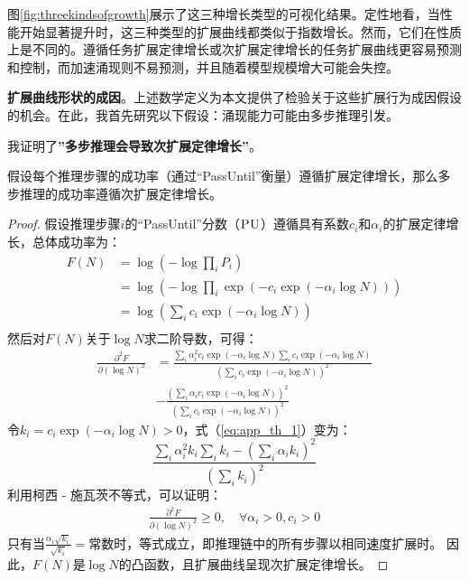 图\ref{fig:threekindsofgrowth}展示了这三种增长类型的可视化结果。定性地看，当性能开始显著提升时，这三种类型的扩展曲线都类似于指数增长。然而，它们在性质上是不同的。遵循任务扩展定律增长或次扩展定律增长的任务扩展曲线更容易预测和控制，而加速涌现则不易预测，并且随着模型规模增大可能会失控。

{\textbf{扩展曲线形状的成因}。上述数学定义为本文提供了检验关于这些扩展行为成因假设的机会。在此，我首先研究以下假设：涌现能力可能由多步推理引发\citep{srivastava2022beyond, wei2022emergent, schaeffer2023emergent}。}

我证明了\textbf{”多步推理会导致次扩展定律增长”}。

\begin{theorem}
假设每个推理步骤的成功率（通过“PassUntil”衡量）遵循扩展定律增长，那么多步推理的成功率遵循次扩展定律增长。
\end{theorem}


    
\begin{proof}
    假设推理步骤\(i\)的“PassUntil”分数（\(\textsc{PU}\)）遵循具有系数\(c_i\)和\(\alpha_i\)的扩展定律增长，总体成功率为：
    \begin{equation}
    \begin{split}
     F(N) & = \operatorname{log}\left(-\operatorname{log}\prod_i P_i\right)\\ & = \operatorname{log}\left(-\operatorname{log} \prod_i\operatorname{exp}\left(- c_i \operatorname{exp}(-\alpha_i \operatorname{log} N)\right)\right) \\ & = \operatorname{log}\left(\sum_i c_i \operatorname{exp}\left(-\alpha_i \operatorname{log} N \right)\right)\\
    \end{split}
    \end{equation}
    然后对\(F(N)\)关于\(\log N\)求二阶导数，可得：
    \begin{equation}
    \label{eq:app_th_1}
    \begin{split}
        \frac{\partial^2{F}}{\partial{(\operatorname{log}N )^2}} & = \frac{\sum_i \alpha_i^2 c_i \exp(-\alpha_i \log N) \sum_i c_i \exp(-\alpha_i \log N)}{(\sum_i c_i\exp(-\alpha_i \log N))^2} \\
    & - \frac{(\sum_i \alpha_i c_i \exp(-\alpha_i \log N) )^2}{(\sum_i c_i\exp(-\alpha_i \log N))^2}
    \end{split}
    \end{equation}
    令\(k_i = c_i \exp(-\alpha_i \log N) > 0\)，式（\ref{eq:app_th_1}）变为：
    \begin{equation}
    \frac{\sum_i \alpha_i^2 k_i\sum_i k_i - (\sum_i \alpha_i k_i)^2}{(\sum_i k_i)^2}
    \end{equation}
    利用柯西 - 施瓦茨不等式，可以证明：
    \begin{align}
    \frac{\partial^2{F}}{\partial{(\operatorname{log}N )^2}} \geq 0, \quad \forall  \alpha_i > 0, c_i > 0
    \end{align}
    只有当\(\frac{\alpha_i \sqrt{k_i}}{\sqrt{k_i}} = \text{常数}\)时，等式成立，即推理链中的所有步骤以相同速度扩展时。
    因此，\(F(N)\)是\(\operatorname{log}N\)的凸函数，且扩展曲线呈现次扩展定律增长。 
\end{proof}


